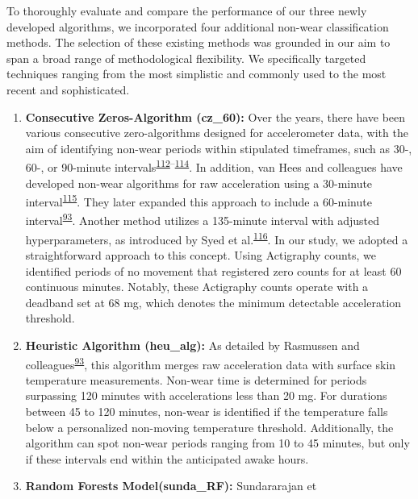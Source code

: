 \documentclass[
  9pt,
]{scrbook}
\begin{document}
To thoroughly evaluate and compare the performance of our three newly
developed algorithms, we incorporated four additional non-wear
classification methods. The selection of these existing methods was
grounded in our aim to span a broad range of methodological flexibility.
We specifically targeted techniques ranging from the most simplistic and
commonly used to the most recent and sophisticated.

\begin{enumerate}
\def\labelenumi{\arabic{enumi}.}
\item
  \textsf{\textbf{Consecutive Zeros-Algorithm (cz\_60):}} Over the
  years, there have been various consecutive zero-algorithms designed
  for accelerometer data, with the aim of identifying non-wear periods
  within stipulated timeframes, such as 30-, 60-, or 90-minute
  intervals\textsuperscript{\protect\hyperlink{ref-hecht_methodology_2009}{112}--\protect\hyperlink{ref-choi_validation_2011}{114}}.
  In addition, van Hees and colleagues have developed non-wear
  algorithms for raw acceleration using a 30-minute
  interval\textsuperscript{\protect\hyperlink{ref-van_hees_estimation_2011}{115}}.
  They later expanded this approach to include a 60-minute
  interval\textsuperscript{\protect\hyperlink{ref-rasmussen_short-term_2020}{93}}.
  Another method utilizes a 135-minute interval with adjusted
  hyperparameters, as introduced by Syed et
  al.\textsuperscript{\protect\hyperlink{ref-syed_evaluating_2020}{116}}.
  In our study, we adopted a straightforward approach to this concept.
  Using Actigraphy counts, we identified periods of no movement that
  registered zero counts for at least 60 continuous minutes. Notably,
  these Actigraphy counts operate with a deadband set at 68 mg, which
  denotes the minimum detectable acceleration threshold.
\item
  \textsf{\textbf{Heuristic Algorithm (heu\_alg):}} As detailed by
  Rasmussen and
  colleagues\textsuperscript{\protect\hyperlink{ref-rasmussen_short-term_2020}{93}},
  this algorithm merges raw acceleration data with surface skin
  temperature measurements. Non-wear time is determined for periods
  surpassing 120 minutes with accelerations less than 20 mg. For
  durations between 45 to 120 minutes, non-wear is identified if the
  temperature falls below a personalized non-moving temperature
  threshold. Additionally, the algorithm can spot non-wear periods
  ranging from 10 to 45 minutes, but only if these intervals end within
  the anticipated awake hours.
\item
  \textsf{\textbf{Random Forests Model(sunda\_RF):}} Sundararajan et

\end{enumerate}
\end{document}
